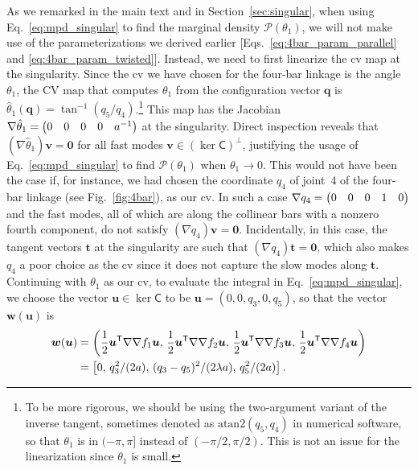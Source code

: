 As we remarked in the main text and in Section~\ref{sec:singular}, when using Eq.~\eqref{eq:mpd_singular} to find the marginal density $\mathscr{P}(\mathscr{\theta}_{1})$, we will not make use of the parameterizations we derived earlier [Eqs.~\eqref{eq:4bar_param_parallel} and \eqref{eq:4bar_param_twisted}].
Instead, we need to first linearize the \ac{cv} map at the singularity.
Since the \ac{cv} we have chosen for the four-bar linkage is the angle $\theta_{1}$, the CV map that computes $\theta_{1}$ from the configuration vector $\bm{q}$ is $\hat{\theta}_{1}(\bm{q}) = \tan^{-1}(q_{5}/q_{4})$.\footnote{To be more rigorous, we should be using the two-argument variant of the inverse tangent, sometimes denoted as $\mathrm{atan2}(q_{5},q_{4})$ in numerical software, so that $\theta_{1}$ is in $(-\pi, \pi]$ instead of $(-\pi/2,\pi/2)$.  This is not an issue for the linearization since $\theta_{1}$ is small.}
This map has the Jacobian $\nabla\hat{\theta}_1 = \begin{pmatrix}0 & 0 & 0 & 0 & a^{-1}\end{pmatrix}$ at the singularity.
Direct inspection reveals that $(\nabla\hat{\theta}_{1})\bm{v} = \bm{0}$ for all fast modes $\bm{v} \in (\ker\mathsf{C})^{\perp}$, justifying the usage of Eq.~\eqref{eq:mpd_singular} to find $\mathscr{P}(\mathscr{\theta}_{1})$ when $\theta_{1} \to 0$.
This would not have been the case if, for instance, we had chosen the coordinate $q_{4}$ of joint~4 of the four-bar linkage (see Fig.~\ref{fig:4bar}), as our \ac{cv}.
In such a case $\nabla{q_{4}} = \begin{pmatrix}0 & 0 & 0 & 1 & 0\end{pmatrix}$ and the fast modes, all of which are along the collinear bars with a nonzero fourth component, do not satisfy $(\nabla q_{4})\bm{v} = \bm{0}$.
Incidentally, in this case, the tangent vectors $\bm{t}$ at the singularity are such that $(\nabla q_{4})\bm{t} = \bm{0}$, which also makes $q_{4}$ a poor choice as the \ac{cv} since it does not capture the slow modes along $\bm{t}$.
Continuing with $\theta_{1}$ as our \ac{cv}, to evaluate the integral in Eq.~\eqref{eq:mpd_singular}, we choose the vector $\bm{u} \in \ker \mathsf{C}$ to be $\bm{u} = (0, 0, q_3, 0, q_{5})$, so that the vector $\bm{w}(\bm{u})$ is
%
\begin{equation}
  \begin{aligned}
    \bm{w}(\bm{u}) &= \left(\frac{1}{2}\bm{u}^\mathsf{T} \nabla\nabla f_1 \bm{u},\, \frac{1}{2}\bm{u}^\mathsf{T}\nabla\nabla f_2\bm{u},\, \frac{1}{2}\bm{u}^\mathsf{T}\nabla\nabla f_3\bm{u},\, \frac{1}{2}\bm{u}^\mathsf{T}\nabla\nabla f_4\bm{u} \right)\\
      &= \left[0,\,q_3^2/(2a),\,(q_3-q_5)^2/(2\lambda a),\,q_5^2/(2a)\right].
  \end{aligned}
  \label{eq:4bar_w}
\end{equation}
